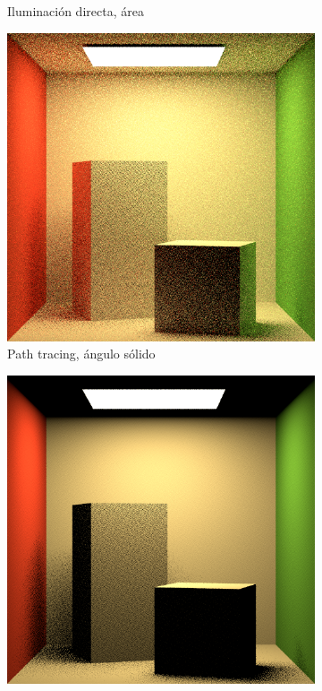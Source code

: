 \begin{figure}[h!]
{\begin{minipage}{\dimexpr .5\textwidth-\fboxsep-2\fboxrule}
\begin{subfigure}{\textwidth}
            \caption{Iluminación directa, área}
            \end{subfigure}  
    \end{minipage}
    \hfill
\begin{minipage}{\dimexpr .5\textwidth-\fboxsep-2\fboxrule}
   \begin{subfigure}{\textwidth}
            \centering
            \includegraphics[width=\textwidth]{imagenes/rectangle6}
            \caption{Path tracing, ángulo sólido}
            \end{subfigure}
            \begin{subfigure}{\textwidth}
            \centering
            \includegraphics[width=\textwidth]{imagenes/rectangle8}

\end{subfigure}
\end{minipage}}
\end{figure}
